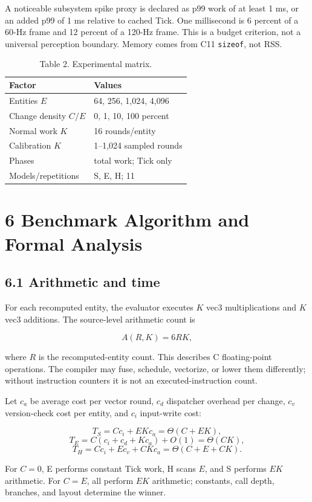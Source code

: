 A noticeable subsystem spike proxy is declared as p99 work of at least 1 ms, or an added p99 of 1 ms relative to cached Tick. One millisecond is 6 percent of a 60-Hz frame and 12 percent of a 120-Hz frame. This is a budget criterion, not a universal perception boundary. Memory comes from C11 \texttt{sizeof}, not RSS.

\begin{table}
\caption{Table 2. Experimental matrix.}
\begin{tabular}{ll}
Factor & Values \\
\hline
Entities \(E\) & 64, 256, 1,024, 4,096 \\
Change density \(C/E\) & 0, 1, 10, 100 percent \\
Normal work \(K\) & 16 rounds/entity \\
Calibration \(K\) & 1--1,024 sampled rounds \\
Phases & total work; Tick only \\
Models/repetitions & S, E, H; 11 \\
\end{tabular}
\end{table}

\section{6 Benchmark Algorithm and Formal Analysis}

\subsection{6.1 Arithmetic and time}

For each recomputed entity, the evaluator executes \(K\) vec3 multiplications and \(K\) vec3 additions. The source-level arithmetic count is

\[
A(R,K)=6RK,
\]

where \(R\) is the recomputed-entity count. This describes C floating-point operations. The compiler may fuse, schedule, vectorize, or lower them differently; without instruction counters it is not an executed-instruction count.

Let \(c_a\) be average cost per vector round, \(c_d\) dispatcher overhead per change, \(c_v\) version-check cost per entity, and \(c_i\) input-write cost:

\[
T_S=Cc_i+EKc_a=\Theta(C+EK),
\]
\[
T_E=C(c_i+c_d+Kc_a)+O(1)=\Theta(CK),
\]
\[
T_H=Cc_i+Ec_v+CKc_a=\Theta(C+E+CK).
\]

For \(C=0\), E performs constant Tick work, H scans \(E\), and S performs \(EK\) arithmetic. For \(C=E\), all perform \(EK\) arithmetic; constants, call depth, branches, and layout determine the winner.

